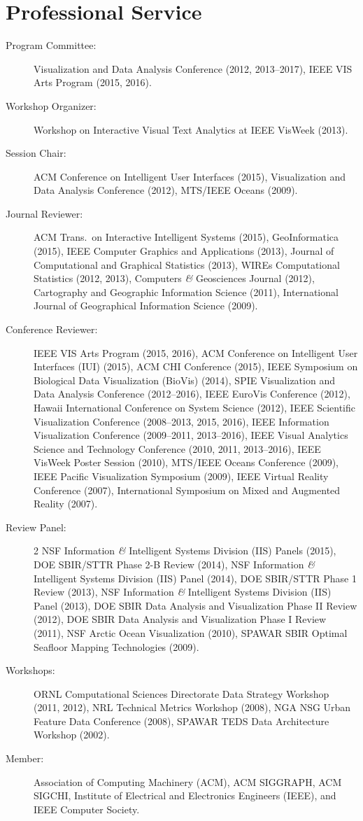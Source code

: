 \documentclass[11pt, a4paper]{article}
\newcommand{\amper}{{\fontspec[Scale=.95]{Hoefler Text}\selectfont\itshape\&}}
\begin{document}
\section*{Professional Service}
\begin{sloppypar}
\begin{description}
  \item[Program Committee:]Visualization and Data Analysis Conference (2012, 2013--2017), IEEE VIS Arts Program (2015, 2016).
  \item[Workshop Organizer:]Workshop on Interactive Visual Text Analytics at IEEE VisWeek (2013).
  \item[Session Chair:]ACM Conference on Intelligent User Interfaces (2015), Visualization and
  Data Analysis Conference (2012), MTS/IEEE Oceans (2009).
  \item[Journal Reviewer:] ACM Trans.\ on Interactive Intelligent Systems (2015), GeoInformatica (2015), IEEE Computer Graphics and Applications (2013),
  Journal of Computational and Graphical Statistics (2013),
  WIREs Computational Statistics (2012, 2013),
  Computers \amper{} Geosciences Journal (2012),
  Cartography and Geographic Information Science (2011),
  International Journal of Geographical Information Science (2009).
  \item[Conference Reviewer:] IEEE VIS Arts Program (2015, 2016),
  ACM Conference on Intelligent User Interfaces
  (IUI) (2015), ACM CHI Conference (2015),
  IEEE Symposium on Biological Data Visualization (BioVis) (2014),
  SPIE Visualization and Data Analysis Conference (2012--2016),
  IEEE EuroVis Conference (2012),
  Hawaii International Conference on System
  Science (2012), IEEE Scientific Visualization Conference (2008--2013, 2015,
  2016), IEEE Information Visualization Conference (2009--2011, 2013--2016),
  IEEE Visual Analytics Science and Technology Conference (2010, 2011, 2013--2016), IEEE VisWeek Poster Session (2010),
  MTS/IEEE Oceans Conference (2009), IEEE Pacific Visualization Symposium
  (2009), IEEE Virtual Reality Conference (2007), International Symposium
  on Mixed and Augmented Reality (2007).
  \item[Review Panel:] 2 NSF Information \amper{} Intelligent Systems Division (IIS) Panels (2015), DOE SBIR/STTR Phase 2-B Review (2014),
  NSF Information \amper{} Intelligent Systems Division
  (IIS) Panel (2014), DOE SBIR/STTR Phase 1 Review (2013),
  NSF Information \amper{} Intelligent Systems Division (IIS) Panel (2013),
  DOE SBIR Data Analysis and Visualization Phase II Review
  (2012), DOE SBIR Data Analysis and Visualization Phase I Review (2011),
  NSF Arctic Ocean Visualization (2010), SPAWAR SBIR Optimal
  Seafloor Mapping Technologies (2009).
  \item[Workshops:] ORNL Computational Sciences Directorate Data Strategy
  Workshop (2011, 2012), NRL Technical Metrics Workshop (2008), NGA NSG Urban
  Feature Data Conference (2008), SPAWAR TEDS Data Architecture Workshop (2002).
  \item[Member:] Association of Computing Machinery (ACM), ACM SIGGRAPH,
  ACM SIGCHI, Institute of Electrical and Electronics Engineers (IEEE), and
  IEEE Computer Society.
\end{description}
\end{sloppypar}
\end{document}
